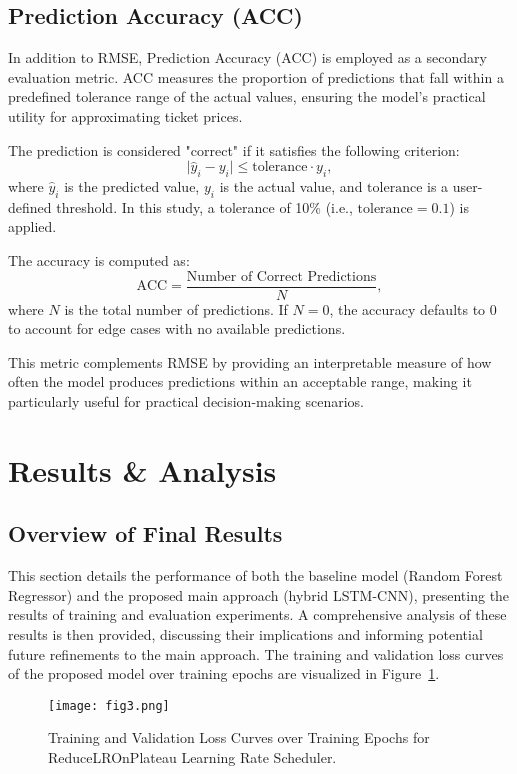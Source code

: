 \documentclass[conference]{IEEEtran}
\begin{document}
\subsection{Prediction Accuracy (ACC)}\label{6b}
In addition to RMSE, Prediction Accuracy (ACC) is employed as a secondary evaluation metric. ACC measures the proportion of predictions that fall within a predefined tolerance range of the actual values, ensuring the model's practical utility for approximating ticket prices.

The prediction is considered "correct" if it satisfies the following criterion:
\[
\lvert \hat{y}_i - y_i \rvert \leq \text{tolerance} \cdot y_i,
\]
where $\hat{y}_i$ is the predicted value, $y_i$ is the actual value, and $\text{tolerance}$ is a user-defined threshold. In this study, a tolerance of 10\% (i.e., $\text{tolerance} = 0.1$) is applied. 

The accuracy is computed as:
\[
\text{ACC} = \frac{\text{Number of Correct Predictions}}{N},
\]
where $N$ is the total number of predictions. If $N = 0$, the accuracy defaults to 0 to account for edge cases with no available predictions.

This metric complements RMSE by providing an interpretable measure of how often the model produces predictions within an acceptable range, making it particularly useful for practical decision-making scenarios.


\section{Results \& Analysis}
\subsection{Overview of Final Results}\label{7a}
This section details the performance of both the baseline model (Random Forest Regressor) and the proposed main approach (hybrid LSTM-CNN), presenting the results of training and evaluation experiments. A comprehensive analysis of these results is then provided, discussing their implications and informing potential future refinements to the main approach. The training and validation loss curves of the proposed model over training epochs are visualized in Figure~\ref{fig:loss_curves}.

\begin{figure}[htbp]
    \centering
    \texttt{[image: fig3.png]}
    \caption{Training and Validation Loss Curves over Training Epochs for ReduceLROnPlateau Learning Rate Scheduler.}
    \label{fig:loss_curves}
\end{figure}
\end{document}

